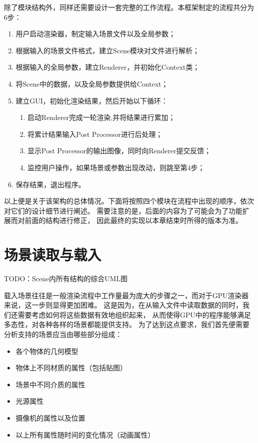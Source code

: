 除了模块结构外，同样还需要设计一套完整的工作流程。本框架制定的流程共分为6步：

\begin{enumerate}
    \item{用户启动渲染器，制定输入场景文件以及全局参数；}
    \item{根据输入的场景文件格式，建立Scene模块对文件进行解析；}
    \item{根据输入的全局参数，建立Renderer，并初始化Context类；}
    \item{将Scene中的数据，以及全局参数提供给Context；}
    \item{建立GUI，初始化渲染结果，然后开始以下循环：}
    \begin{enumerate}
        \item{启动Renderer完成一轮渲染,并将结果进行累加；}
        \item{将累计结果输入Post Processor进行后处理；}
        \item{显示Post Processor的输出图像，同时向Renderer提交反馈；}
        \item{监控用户操作，如果场景或参数出现改动，则跳至第4步；}
    \end{enumerate}
    \item{保存结果，退出程序。}
\end{enumerate}

以上便是关于该架构的总体情况。下面将按照四个模块在流程中出现的顺序，依次对它们的设计细节进行阐述。
需要注意的是，后面的内容为了可能会为了功能扩展而对前面的结构进行修正，
因此最终的实现以本章结束时所得的版本为准。

\section{场景读取与载入}

TODO：Scene内所有结构的综合UML图

载入场景往往是一般渲染流程中工作量最为庞大的步骤之一，而对于GPU渲染器来说，这一步则显得更加困难。
这是因为，在从输入文件中读取数据的同时，我们还需要考虑如何将这些数据有效地组织起来，
从而使得GPU中的程序能够满足多态性，对各种各样的场景都能提供支持。
为了达到这点要求，我们首先便需要分析支持的场景应当由哪些部分组成：

\begin{itemize}
\item{各个物体的几何模型}
\item{物体上不同材质的属性（包括贴图）} 
\item{场景中不同介质的属性} 
\item{光源属性}
\item{摄像机的属性以及位置}
\item{以上所有属性随时间的变化情况（动画属性）}  
\end{itemize}

